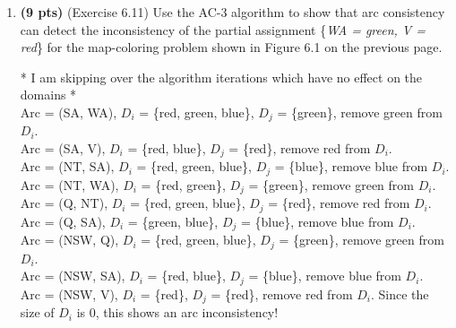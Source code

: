 \documentclass{article}
\begin{document}
\begin{enumerate}


\item \textbf{(9 pts)} (Exercise 6.11) Use the AC-3 algorithm to show that arc consistency can detect the inconsistency of the partial assignment \{\textit{WA = green, V = red}\} for the map-coloring problem shown in Figure 6.1 on the previous page.

\color{blue}
    * I am skipping over the algorithm iterations which have no effect on the domains *\\
    Arc = (SA, WA), $D_i$ = \{red, green, blue\}, $D_j$ = \{green\}, remove green from $D_i$.\\
    Arc = (SA, V), $D_i$ = \{red, blue\}, $D_j$ = \{red\}, remove red from $D_i$.\\
    Arc = (NT, SA), $D_i$ = \{red, green, blue\}, $D_j$ = \{blue\}, remove blue from $D_i$.\\
    Arc = (NT, WA), $D_i$ = \{red, green\}, $D_j$ = \{green\}, remove green from $D_i$.\\
    Arc = (Q, NT), $D_i$ = \{red, green, blue\}, $D_j$ = \{red\}, remove red from $D_i$.\\
    Arc = (Q, SA), $D_i$ = \{green, blue\}, $D_j$ = \{blue\}, remove blue from $D_i$.\\
    Arc = (NSW, Q), $D_i$ = \{red, green, blue\}, $D_j$ = \{green\}, remove green from $D_i$.\\
    Arc = (NSW, SA), $D_i$ = \{red, blue\}, $D_j$ = \{blue\}, remove blue from $D_i$.\\
    Arc = (NSW, V), $D_i$ = \{red\}, $D_j$ = \{red\}, remove red from $D_i$. Since the size of $D_i$ is 0, this shows an arc inconsistency!
\color{black}


\end{enumerate}
\end{document}
